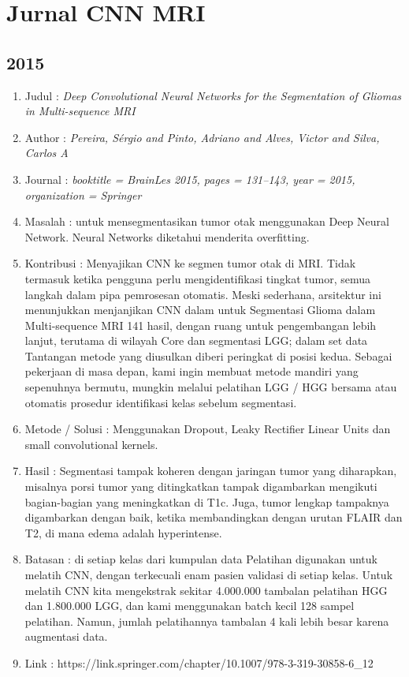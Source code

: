 \section{Jurnal CNN MRI}
\subsection{2015}
\begin{enumerate}
  \item Judul : \textit{Deep Convolutional Neural Networks for the Segmentation of Gliomas in Multi-sequence MRI}
  \item Author : \textit{Pereira, S{\'e}rgio and Pinto, Adriano and Alves, Victor and Silva, Carlos A}
  \item Journal : \textit{booktitle = BrainLes 2015, pages = 131--143, year = 2015, organization = Springer}
  \item Masalah : untuk mensegmentasikan tumor otak menggunakan Deep Neural Network. Neural Networks diketahui menderita overfitting.
  \item Kontribusi : Menyajikan CNN ke segmen tumor otak di MRI. Tidak termasuk ketika pengguna perlu mengidentifikasi tingkat tumor, semua langkah dalam pipa pemrosesan otomatis. Meski sederhana, arsitektur ini menunjukkan menjanjikan
CNN dalam untuk Segmentasi Glioma dalam Multi-sequence MRI 141
hasil, dengan ruang untuk pengembangan lebih lanjut, terutama di wilayah Core dan
segmentasi LGG; dalam set data Tantangan metode yang diusulkan diberi peringkat
di posisi kedua. Sebagai pekerjaan di masa depan, kami ingin membuat metode mandiri yang sepenuhnya bermutu, mungkin melalui pelatihan LGG / HGG bersama atau otomatis
prosedur identifikasi kelas sebelum segmentasi.

  \item Metode / Solusi : Menggunakan Dropout, Leaky Rectifier Linear Units dan small convolutional kernels.
  \item Hasil : Segmentasi tampak koheren dengan jaringan tumor yang diharapkan, misalnya
porsi tumor yang ditingkatkan tampak digambarkan mengikuti bagian-bagian yang meningkatkan di
T1c. Juga, tumor lengkap tampaknya digambarkan dengan baik, ketika membandingkan
dengan urutan FLAIR dan T2, di mana edema adalah hyperintense.
  \item Batasan : di setiap kelas dari kumpulan data Pelatihan digunakan untuk melatih CNN, dengan
terkecuali enam pasien validasi di setiap kelas. Untuk melatih CNN kita
mengekstrak sekitar 4.000.000 tambalan pelatihan HGG dan 1.800.000 LGG, dan
kami menggunakan batch kecil 128 sampel pelatihan. Namun, jumlah pelatihannya
tambalan 4 kali lebih besar karena augmentasi data.
  \item Link : https://link.springer.com/chapter/10.1007/978-3-319-30858-6_12
\end{enumerate} 
